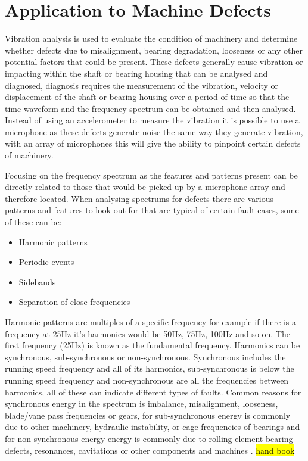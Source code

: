 \documentclass{UoNMCHA}
\numberwithin{equation}{section}
\begin{document}
\newpage
\section{Application to Machine Defects} \label{sec:Machine Defects}

Vibration analysis is used to evaluate the condition of machinery and determine whether defects due to misalignment, bearing degradation, looseness or any other potential factors that could be present. These defects generally cause vibration or impacting within the shaft or bearing housing that can be analysed and diagnosed, diagnosis requires the measurement of the vibration, velocity or displacement of the shaft or bearing housing over a period of time so that the time waveform and the frequency spectrum can be obtained and then analysed. Instead of using an accelerometer to measure the vibration it is possible to use a microphone as these defects generate noise the same way they generate vibration, with an array of microphones this will give the ability to pinpoint certain defects of machinery.

Focusing on the frequency spectrum as the features and patterns present can be directly related to those that would be picked up by a microphone array and therefore located. When analysing spectrums for defects there are various patterns and features to look out for that are typical of certain fault cases, some of these can be:

\begin{itemize}
    \item Harmonic patterns
    \item Periodic events
    \item Sidebands
    \item Separation of close frequencies
\end{itemize}

Harmonic patterns are multiples of a specific frequency for example if there is a frequency at 25Hz it's harmonics would be 50Hz, 75Hz, 100Hz and so on. The first frequency (25Hz) is known as the fundamental frequency.
Harmonics can be synchronous, sub-synchronous or non-synchronous. Synchronous includes the running speed frequency and all of its harmonics, sub-synchronous is below the running speed frequency and non-synchronous are all the frequencies between harmonics, all of these can indicate different types of faults. Common reasons for synchronous energy in the spectrum is imbalance, misalignment, looseness, blade/vane pass frequencies or gears, for sub-synchronous energy is commonly due to other machinery, hydraulic instability, or cage frequencies of bearings and for non-synchronous energy energy is commonly due to rolling element bearing defects, resonances, cavitations or other components and machines \citep{Mob20}. \hl{hand book}
\end{document}
